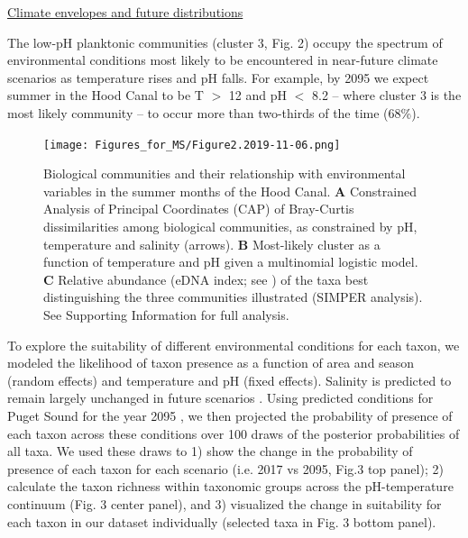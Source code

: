 \documentclass[11pt]{article}
\begin{document}
\begin{linenumbers}
\underline{Climate envelopes and future distributions}

The low-pH planktonic communities (cluster 3, Fig. 2) occupy the spectrum of environmental conditions most likely to be encountered in near-future climate scenarios as temperature rises and pH falls. For example, by 2095 we expect summer in the Hood Canal to be T $>$ 12 and pH $<$ 8.2 -- where cluster 3 is the most likely community -- to occur more than two-thirds of the time (68\%). 




\begin{figure}%
\centering
\texttt{[image: Figures\_for\_MS/Figure2.2019-11-06.png]}
\caption{\footnotesize{Biological communities and their relationship with environmental variables in the summer months of the Hood Canal. \textbf{A} Constrained Analysis of Principal Coordinates (CAP) of Bray-Curtis dissimilarities among biological communities, as constrained by pH, temperature and salinity (arrows). \textbf{B} Most-likely cluster as a function of temperature and pH given a multinomial logistic model. \textbf{C} Relative abundance (eDNA index; see \cite{kelly2019understanding}) of the taxa best distinguishing the three communities illustrated (SIMPER analysis). See Supporting Information for full analysis.}}
\label{fig:Fig2}
\end{figure}

 To explore the suitability of different environmental conditions for each taxon, we modeled the likelihood of taxon presence as a function of area and season (random effects) and temperature and pH (fixed effects).  Salinity is predicted to remain largely unchanged in future scenarios \cite{khangaonkar2019salish}. Using predicted conditions for Puget Sound for the year 2095 \cite{khangaonkar2019salish}, we then projected the probability of presence of each taxon across these conditions over 100 draws of the posterior probabilities of all taxa. We used these draws to 1) show the change in the probability of presence of each taxon for each scenario (i.e. 2017 vs 2095, Fig.3 top panel); 2) calculate the  taxon richness within taxonomic groups across the pH-temperature continuum (Fig. 3 center panel),%
  and 3) visualized the change in suitability for each taxon in our dataset individually (selected taxa in Fig. 3 bottom panel). 


\end{linenumbers}
\end{document}
